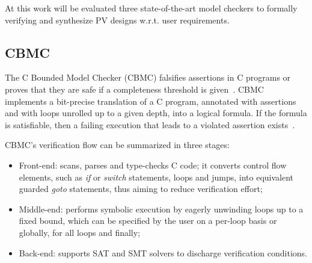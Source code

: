 
At this work will be evaluated three state-of-the-art model checkers to formally verifying and synthesize PV designs w.r.t. user requirements.

\subsection{CBMC}

The C Bounded Model Checker (CBMC) falsifies assertions in C programs or proves that they are safe if a completeness threshold is given~\cite{Kroening}. CBMC implements a bit-precise translation of a C program, annotated with assertions and with loops unrolled up to a given depth, into a logical formula. If the formula is satisfiable, then a failing execution that leads to a violated assertion exists~\cite{Kroening}. 

CBMC's verification flow can be summarized in three stages: 

\begin{itemize}
\item Front-end: scans, parses and type-checks C code; it converts control flow elements, such as \textit{if} or \textit{switch} statements, loops and jumps, into equivalent guarded \textit{goto} statements, thus aiming to reduce verification effort; 
\item Middle-end: performs symbolic execution by eagerly unwinding loops up to a fixed bound, which can be specified by the user on a per-loop basis or globally, for all loops and finally; 
\item Back-end: supports SAT and SMT solvers to discharge verification conditions.
\end{itemize}


